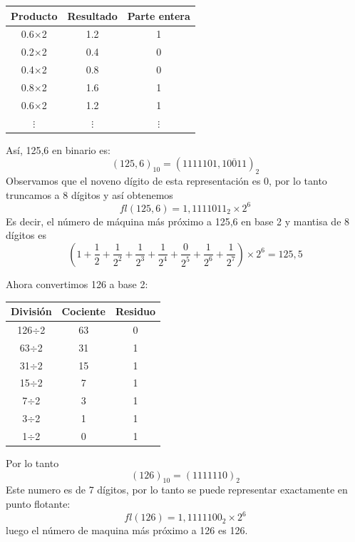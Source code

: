 \documentclass[12pt, a4paper]{article}%
\begin{document}
\begin{itemize}
\begin{itemize}
\begin{solution}
\begin{center}
                \begin{tabular}{|c|c|c|}\hline
                   Producto & Resultado & Parte entera \\ \hline
                    0.6$\times$2 & 1.2 & 1 \\
                    0.2$\times$2 & 0.4 & 0 \\
                    0.4$\times$2 & 0.8 & 0 \\
                    0.8$\times$2 & 1.6 & 1 \\
                    0.6$\times$2 & 1.2 & 1\\
                    $\vdots$ & $\vdots$ & $\vdots$ \\ \hline
                \end{tabular}
            \end{center}
            Así, 125,6 en binario es:
            \[
            (125,6)_{10}=(1111101,\overline{10011})_{2}
            \]
            Observamos que el noveno dígito de esta representación es 0, por lo tanto truncamos a 8 dígitos y así obtenemos
            \[
            fl(125,6)=1,1111011_{2}\times2^{6}
            \]
            Es decir, el número de máquina más próximo a 125,6 en base 2 y mantisa de 8 dígitos es 
            \[
        \left(1+\frac{1}{2}+\frac{1}{2^{2}}+\frac{1}{2^{3}}+\frac{1}{2^{4}}+\frac{0}{2^{5}}+\frac{1}{2^{6}}+\frac{1}{2^{7}}\right)\times 2^{6}=125,5 
            \]
            
            Ahora convertimos 126 a base 2:
            \begin{center}
            \renewcommand{\arraystretch}{1.2}
                \begin{tabular}{|c|c|c|}\hline
                División & Cociente & Residuo\\ \hline
                126$\div$2 & 63 & 0 \\ 
                63$\div$2 & 31 & 1 \\ 
                31$\div$2 & 15 & 1 \\
                15$\div$2 & 7 & 1 \\
                7$\div$2 & 3 & 1 \\
                3$\div$2 & 1 & 1 \\
                1$\div$2 & 0 & 1\\ \hline
                \end{tabular}
            \end{center}
            Por lo tanto
            \[
            (126)_{10}=(1111110)_{2}
            \]
            Este numero es de 7 dígitos, por lo tanto se puede representar exactamente en punto flotante:
            \[
            fl(126)=1,1111100_{2}\times2^{6}
            \]
            luego el número de maquina más próximo a 126 es 126.
            

\end{solution}
\end{itemize}
\end{itemize}
\end{document}
